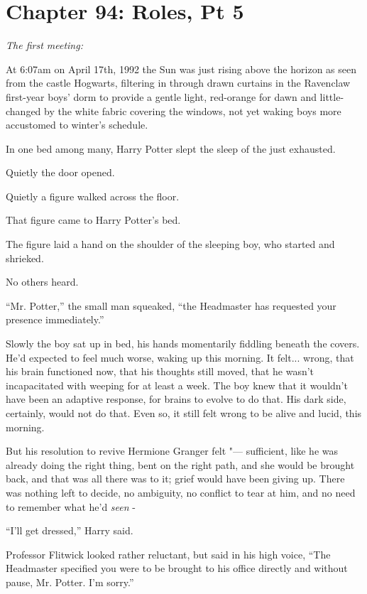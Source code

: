 \chapter{Chapter 94: Roles, Pt 5}
\emph{The first meeting:}

At 6:07am on April 17th, 1992 the Sun was just rising above the horizon
as seen from the castle Hogwarts, filtering in through drawn curtains in
the Ravenclaw first-year boys' dorm to provide a gentle light,
red-orange for dawn and little-changed by the white fabric covering the
windows, not yet waking boys more accustomed to winter's schedule.

In one bed among many, Harry Potter slept the sleep of the just
exhausted.

Quietly the door opened.

Quietly a figure walked across the floor.

That figure came to Harry Potter's bed.

The figure laid a hand on the shoulder of the sleeping boy, who started
and shrieked.

No others heard.

``Mr. Potter,'' the small man squeaked, ``the Headmaster has requested
your presence immediately.''

Slowly the boy sat up in bed, his hands momentarily fiddling beneath the
covers. He'd expected to feel much worse, waking up this morning. It
felt... wrong, that his brain functioned now, that his thoughts
still moved, that he wasn't incapacitated with weeping for at least a
week. The boy knew that it wouldn't have been an adaptive response, for
brains to evolve to do that. His dark side, certainly, would not do
that. Even so, it still felt wrong to be alive and lucid, this morning.

But his resolution to revive Hermione Granger felt "--- sufficient, like he
was already doing the right thing, bent on the right path, and she would
be brought back, and that was all there was to it; grief would have been
giving up. There was nothing left to decide, no ambiguity, no conflict
to tear at him, and no need to remember what he'd \emph{seen} -

``I'll get dressed,'' Harry said.

Professor Flitwick looked rather reluctant, but said in his high voice,
``The Headmaster specified you were to be brought to his office directly
and without pause, Mr. Potter. I'm sorry.''

